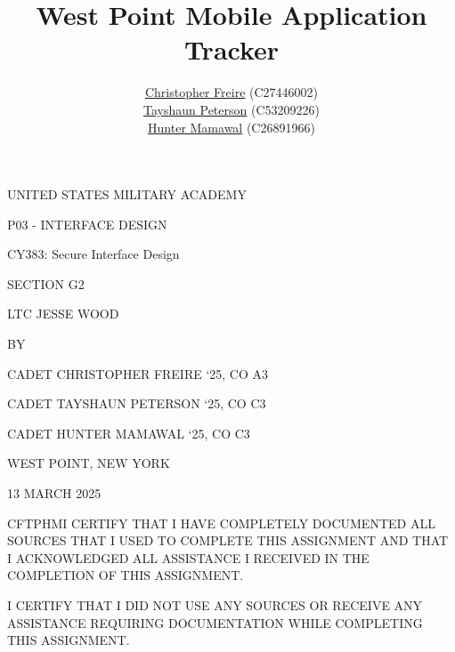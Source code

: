 \documentclass [11pt]{article}
\title{West Point Mobile Application Tracker}
\author{\href{mailto:christopher.freire@westpoint.edu}{Christopher Freire} (C27446002)\\ \href{mailto:tayshaun.peterson@westpoint.edu}{Tayshaun Peterson} (C53209226)\\ \href{mailto:hunter.mamawal@westpoint.edu}{Hunter Mamawal} (C26891966)}
\begin{document}

\begin{titlepage}
\begin{centering}

UNITED STATES MILITARY ACADEMY\vspace{4em}

P03 - INTERFACE DESIGN\vspace{4em}

CY383: Secure Interface Design \vspace{4em}

SECTION G2\vspace{1em}

LTC JESSE WOOD\vspace{4em}

BY\vspace{1em}

CADET CHRISTOPHER FREIRE `25, CO A3\vspace{1em}

CADET TAYSHAUN PETERSON `25, CO C3\vspace{1em}

CADET HUNTER MAMAWAL `25, CO C3\vspace{1em}

WEST POINT, NEW YORK\vspace{1em}


13 MARCH 2025\vspace{4em}

\end{centering}

\noindent
\textunderscore CF\textunderscore TP\textunderscore HM\textunderscore \textunderscore \textunderscore I CERTIFY THAT I HAVE COMPLETELY DOCUMENTED ALL SOURCES THAT I USED TO COMPLETE THIS ASSIGNMENT AND THAT I ACKNOWLEDGED ALL ASSISTANCE I
RECEIVED IN THE COMPLETION OF THIS ASSIGNMENT. \vspace{2em}

\noindent
\textunderscore\textunderscore\textunderscore \textunderscore \textunderscore \textunderscore I CERTIFY THAT I DID NOT USE ANY SOURCES OR RECEIVE ANY ASSISTANCE REQUIRING DOCUMENTATION WHILE COMPLETING THIS ASSIGNMENT. \vspace{2em}


\end{titlepage}
\end{document}
